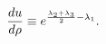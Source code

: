 \begin{equation}
{du\over d\rho}\equiv e^{\frac{\lambda_2+\lambda_3}{2}-\lambda_{1}}.
\label{unuova}
\end{equation}

